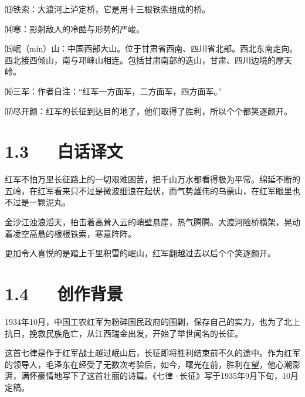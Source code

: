 \documentclass[letterpaper,12pt,english]{sphinxmanual}
\begin{document}
⒀铁索：大渡河上泸定桥，它是用十三根铁索组成的桥。

⒁寒：影射敌人的冷酷与形势的严峻。

⒂岷（mín）山：中国西部大山。位于甘肃省西南、四川省北部。西北\sphinxhyphen{}东南走向。西北接西倾山，南与邛崃山相连。包括甘肃南部的迭山，甘肃、四川边境的摩天岭。

⒃三军：作者自注：“红军一方面军，二方面军，四方面军。”

⒄尽开颜：红军的长征到达目的地了，他们取得了胜利，所以个个都笑逐颜开。


\section{1.3   白话译文}
\label{\detokenize{p01_u6563_u6587/_u6bdb_u6cfd_u4e1c-_u4e03_u5f8b_xb7_u957f_u5f81:id5}}
红军不怕万里长征路上的一切艰难困苦，把千山万水都看得极为平常。绵延不断的五岭，在红军看来只不过是微波细浪在起伏，而气势雄伟的乌蒙山，在红军眼里也不过是一颗泥丸。

金沙江浊浪滔天，拍击着高耸入云的峭壁悬崖，热气腾腾。大渡河险桥横架，晃动着凌空高悬的根根铁索，寒意阵阵。

更加令人喜悦的是踏上千里积雪的岷山，红军翻越过去以后个个笑逐颜开。


\section{1.4   创作背景}
\label{\detokenize{p01_u6563_u6587/_u6bdb_u6cfd_u4e1c-_u4e03_u5f8b_xb7_u957f_u5f81:id6}}
1934年10月，中国工农红军为粉碎国民政府的围剿，保存自己的实力，也为了北上抗日，挽救民族危亡，从江西瑞金出发，开始了举世闻名的长征。

这首七律是作于红军战士越过岷山后，长征即将胜利结束前不久的途中。作为红军的领导人，毛泽东在经受了无数次考验后，如今，曙光在前，胜利在望，他心潮澎湃，满怀豪情地写下了这首壮丽的诗篇。《七律·长征》写于1935年9月下旬，10月定稿。
\end{document}
